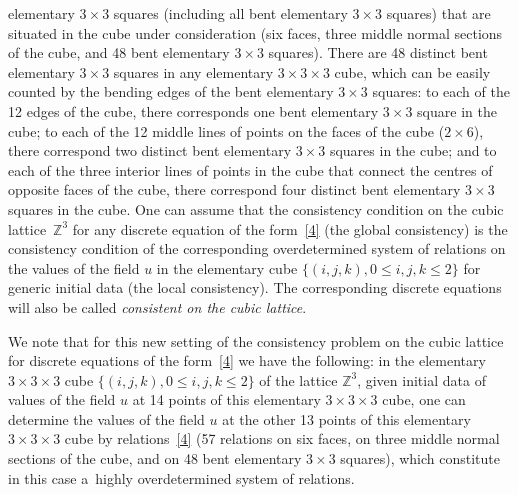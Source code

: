 \documentclass[11pt]{article}
\begin{document}
elementary $3 \times 3$ squares (including all bent elementary $3
\times 3$ squares) that are situated in the cube under consideration
(six faces, three middle normal sections of the cube, and 48 bent
elementary $3 \times 3$ squares). There are 48 distinct bent
elementary $3 \times 3$ squares in any elementary $3 \times 3 \times
3$ cube, which can be easily counted by the bending edges of the
bent elementary $3 \times 3$ squares: to each of the 12 edges of the
cube, there corresponds one bent elementary $3 \times 3$ square in
the cube; to each of the 12 middle lines of points on the faces of
the cube ($2 \times 6$), there correspond two distinct bent
elementary $3 \times 3$ squares in the cube; and to each of the
three interior lines of points in the cube that connect the centres
of opposite faces of the cube, there correspond four distinct bent
elementary $3 \times 3$ squares in the cube. One can assume that the
consistency condition on the cubic lattice~$\mathbb{Z}^3$ for any
discrete equation of the form~\eqref{4} (the global consistency) is the consistency condition
of the corresponding overdetermined system of relations on the
values of the f\/ield $u$ in the elementary cube $\{(i, j, k), 0
\leq i, j, k \leq 2 \}$ for generic initial data (the local consistency). The corresponding
discrete equations will also be called {\it consistent on the cubic
lattice}.




We note that for this new setting of the consistency problem on the
cubic lattice for discrete equations of the form~\eqref{4} we have
the following: in the elementary $3 \times 3 \times 3$ cube $\{(i,
j, k),  0 \leq i, j, k \leq 2 \}$ of the lattice $\mathbb{Z}^3$,
given initial data of values of the f\/ield $u$ at 14 points of this
elementary $3 \times 3 \times 3$ cube, one can determine the values
of the f\/ield $u$ at the other 13 points of this elementary $3 \times
3 \times 3$ cube by relations~\eqref{4} (57 relations on six faces,
on three middle normal sections of the cube, and on 48 bent
elementary $3 \times 3$ squares), which constitute in this case a~highly overdetermined system of relations.
\end{document}
